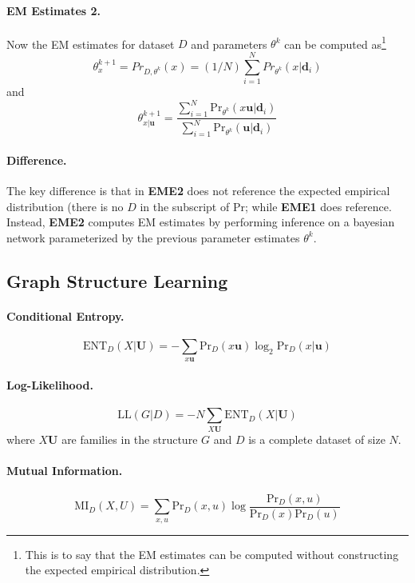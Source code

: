 \documentclass[11pt]{article}
\newcommand{\bd}{\mathbf{d}}
\newcommand{\bu}{\mathbf{u}}
\newcommand{\pr}{\mathrm{Pr}}
\newcommand{\ent}{\mathrm{ENT}}
\begin{document}
\paragraph{EM Estimates 2.} Now the EM estimates for dataset $D$ and parameters $\theta^k$ can be computed as\footnote{This is to say that the EM estimates can be computed without constructing the expected empirical distribution.}
\begin{equation}
	\theta_{x} ^{k + 1} = Pr_{D, \theta^k} (x) = (1/N) \sum_{i = 1}^N Pr_{\theta^k} (x | \bd_i)
\end{equation}
and
\begin{equation}
	\theta_{x|\bu}^{k + 1} = \frac{\sum_{i= 1}^N \pr_{\theta^k} (x\bu | \bd_i)}{\sum_{i = 1}^N \pr_{\theta^k} (\bu | \bd_i)}
\end{equation}

\paragraph{Difference.} The key difference is that in \textbf{EME2} does not reference the expected empirical distribution (there is no $D$ in the subscript of $\pr$; while \textbf{EME1} does reference. Instead, \textbf{EME2} computes EM estimates by performing inference on a bayesian network parameterized by the previous parameter estimates $\theta^k$.  

\subsection{Graph Structure Learning}
\paragraph{Conditional Entropy.}
\begin{equation}
	\ent_D (X | \mathbf U ) = - \sum_{x\bu} \pr_D (x \bu) \log_2 \pr_D(x | \bu)
\end{equation}

\paragraph{Log-Likelihood.}
\begin{equation}
	\mathrm {LL}(G|D) = -N \sum_{X\mathbf U} \ent_D(X | \mathbf U)
\end{equation}
where $X\mathbf U$ are families in the structure $G$ and $D$ is a complete dataset of size $N$. 

\paragraph{Mutual Information.}
\begin{equation}
	\mathrm {MI}_D (X, U) = \sum_{x, u} \pr_D(x, u) \log\frac{\pr_D(x, u)}{\pr_D(x) \pr_D(u)}
\end{equation}
\end{document}
